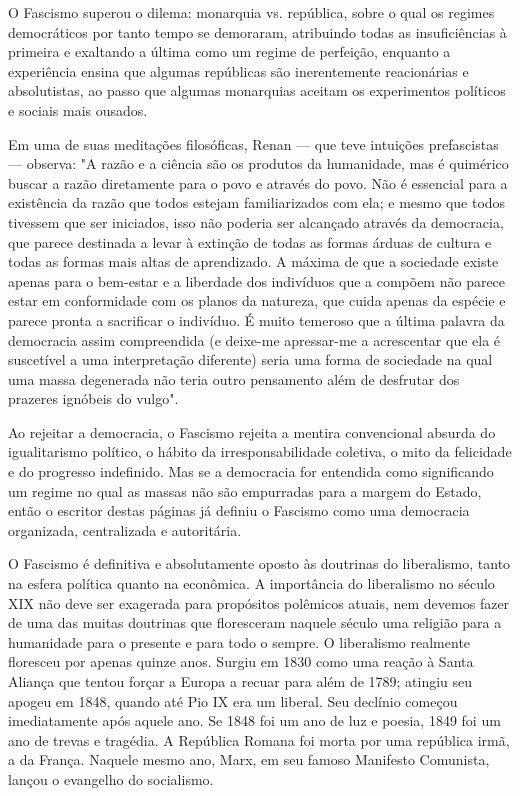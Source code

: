 \documentclass[12pt]{article}
\begin{document}
O Fascismo superou o dilema: monarquia vs. república, sobre o qual os regimes democráticos por tanto tempo se demoraram, atribuindo todas as insuficiências à primeira e exaltando a última como um regime de perfeição, enquanto a experiência ensina que algumas repúblicas são inerentemente reacionárias e absolutistas, ao passo que algumas monarquias aceitam os experimentos políticos e sociais mais ousados.

Em uma de suas meditações filosóficas, Renan — que teve intuições prefascistas — observa: "A razão e a ciência são os produtos da humanidade, mas é quimérico buscar a razão diretamente para o povo e através do povo. Não é essencial para a existência da razão que todos estejam familiarizados com ela; e mesmo que todos tivessem que ser iniciados, isso não poderia ser alcançado através da democracia, que parece destinada a levar à extinção de todas as formas árduas de cultura e todas as formas mais altas de aprendizado. A máxima de que a sociedade existe apenas para o bem-estar e a liberdade dos indivíduos que a compõem não parece estar em conformidade com os planos da natureza, que cuida apenas da espécie e parece pronta a sacrificar o indivíduo. É muito temeroso que a última palavra da democracia assim compreendida (e deixe-me apressar-me a acrescentar que ela é suscetível a uma interpretação diferente) seria uma forma de sociedade na qual uma massa degenerada não teria outro pensamento além de desfrutar dos prazeres ignóbeis do vulgo".

Ao rejeitar a democracia, o Fascismo rejeita a mentira convencional absurda do igualitarismo político, o hábito da irresponsabilidade coletiva, o mito da felicidade e do progresso indefinido. Mas se a democracia for entendida como significando um regime no qual as massas não são empurradas para a margem do Estado, então o escritor destas páginas já definiu o Fascismo como uma democracia organizada, centralizada e autoritária.

O Fascismo é definitiva e absolutamente oposto às doutrinas do liberalismo, tanto na esfera política quanto na econômica. A importância do liberalismo no século XIX não deve ser exagerada para propósitos polêmicos atuais, nem devemos fazer de uma das muitas doutrinas que floresceram naquele século uma religião para a humanidade para o presente e para todo o sempre. O liberalismo realmente floresceu por apenas quinze anos. Surgiu em 1830 como uma reação à Santa Aliança que tentou forçar a Europa a recuar para além de 1789; atingiu seu apogeu em 1848, quando até Pio IX era um liberal. Seu declínio começou imediatamente após aquele ano. Se 1848 foi um ano de luz e poesia, 1849 foi um ano de trevas e tragédia. A República Romana foi morta por uma república irmã, a da França. Naquele mesmo ano, Marx, em seu famoso Manifesto Comunista, lançou o evangelho do socialismo.
\end{document}
